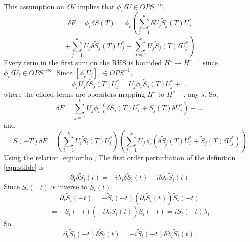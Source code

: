 This assumption on $\delta K$ implies that $\phi_r \delta U \in
OPS^{-\infty}$. 
\[
  \delta F =  \phi_r \delta S(T)  = \phi_r \left(\sum _{j=1}^k \delta U_j \tilde{S}_j(T) U_j^*
\right.
\]
\[
 +  \left. \sum_{j=1}^k U_j \delta\tilde{S}_j(T)U_j^* + \sum_{J=1}^k U_j
    \tilde{S}_j(T)\delta U_j^*\right) 
\]
Every term in the first sum on the RHS is bounded $H^s \rightarrow H^{s-1}$ since
$\phi_r \delta U_i \in OPS^{-\infty}$.  Since $[\phi_rU_i], \in OPS^{-1}$, 
\[
  \phi_r  U_j \delta \tilde{S}_j(T)  U_j^*  = U_j \phi_r
  \tilde{S}_j(T) U_j^*
  +...
\]
where the elided terms are operators mapping $H^s$ to $H^{s-1}$, any
$s$. So,
\[
 \delta F = \sum_{j=1}^k U_j \phi_r \left( \delta\tilde{S}_j(T) U_i^*
   + \tilde{S}_j(T) \delta U_j^*\right)
  + ...
\]
and
\[
 S(-T)\delta F =\left(\sum_{i=1}^k U_i \tilde{S}_i(T)
    U_i^*\right) \left(\sum_{j=1}^k U_j \phi_r ( \delta\tilde{S}_j(T) U_i^*
    + \tilde{S}_j(T) \delta U_j^*)\right)
\]  
Using the relation \ref{eqn:ortho},
The first order perturbation of the definition \ref{eqn:stilde} is
\begin{equation}
  \label{eqn:dstilde}
  \partial_t \delta \tilde{S}_i(t) = - i\lambda_i \delta
  \tilde{S}_i(t) - i\delta \lambda_i \tilde{S}_i(t)
\end{equation}
Since $\tilde{S_i}(-t)$ is inverse to $\tilde{S}_i(t)$,
\[
  \partial_t \tilde{S}_i(-t)= -\tilde{S}_i(-t) (\partial_t \tilde{S}_i(t)) \tilde{S}_i(-t)
\]
\begin{equation}
  \label{eqn:stildeinv}
= -\tilde{S}_i(-t)(-i\lambda_i \tilde{S}_i(t)) \tilde{S}_i(-t) = i\tilde{S}_i(-t)\lambda_i 
\end{equation}
So
\begin{equation}
  \label{eqn:dstildeconj}
  \partial_t\tilde{S}_i(-t)\delta \tilde{S}_i(t) = -i\tilde{S}_i(-t)\delta \lambda_i \tilde{S}_i(t).
\end{equation}
